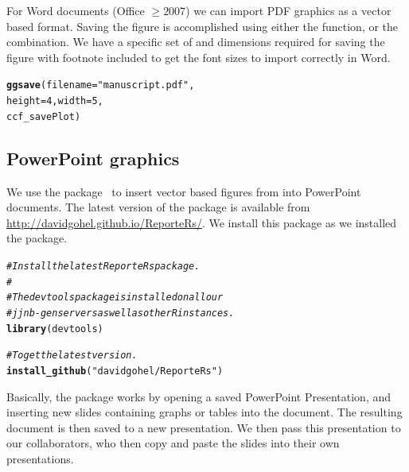 \documentclass[nojss]{jss}\usepackage[]{graphicx}\usepackage[]{color}
\makeatletter
\newcommand{\hlnum}[1]{\textcolor[rgb]{0.686,0.059,0.569}{#1}}%
\newcommand{\hlstr}[1]{\textcolor[rgb]{0.192,0.494,0.8}{#1}}%
\newcommand{\hlcom}[1]{\textcolor[rgb]{0.678,0.584,0.686}{\textit{#1}}}%
\newcommand{\hlstd}[1]{\textcolor[rgb]{0.345,0.345,0.345}{#1}}%
\newcommand{\hlkwc}[1]{\textcolor[rgb]{0.333,0.667,0.333}{#1}}%
\newcommand{\hlkwd}[1]{\textcolor[rgb]{0.737,0.353,0.396}{\textbf{#1}}}%
\newenvironment{kframe}{%
 \def\at@end@of@kframe{}%
 \ifinner\ifhmode%
  \def\at@end@of@kframe{\end{minipage}}%
  \begin{minipage}{\columnwidth}%
 \fi\fi%
 \def\FrameCommand##1{\hskip\@totalleftmargin \hskip-\fboxsep
 \colorbox{shadecolor}{##1}\hskip-\fboxsep
     \hskip-\linewidth \hskip-\@totalleftmargin \hskip\columnwidth}%
 \MakeFramed {\advance\hsize-\width
   \@totalleftmargin\z@ \linewidth\hsize
   \@setminipage}}%
 {\par\unskip\endMakeFramed%
 \at@end@of@kframe}
\newenvironment{knitrout}{}{} %
\makeatother
\begin{document}
For Word documents (Office $\ge 2007$) we can import PDF graphics as a vector based format. Saving the figure is accomplished using either the  function, or the  combination. We have a specific set of  and  dimensions required for saving the figure with footnote included to get the font sizes to import correctly in Word. 
\begin{knitrout}\footnotesize
{}\color{fgcolor}\begin{kframe}
\begin{alltt}
\hlkwd{ggsave}\hlstd{(}\hlkwc{filename}\hlstd{=}\hlstr{"manuscript.pdf"}\hlstd{,}
       \hlkwc{height}\hlstd{=}\hlnum{4}\hlstd{,} \hlkwc{width}\hlstd{=}\hlnum{5}\hlstd{,}
       \hlstd{ccf_savePlot)}
\end{alltt}
\end{kframe}
\end{knitrout}


\subsection{PowerPoint graphics}
We use the  package~\citep{Gohel:2014} to insert vector based figures from  into PowerPoint documents. The latest version of the  package is available from \url{http://davidgohel.github.io/ReporteRs/}. We install this package as we installed the  package.
\begin{knitrout}\footnotesize
{}\color{fgcolor}\begin{kframe}
\begin{alltt}
\hlcom{# Install the latest ReporteRs package.}
\hlcom{#}
\hlcom{# The devtools package is installed on all our }
\hlcom{# jjnb-gen servers as well as other R instances.}
\hlkwd{library}\hlstd{(devtools)}

\hlcom{# To get the latest version.}
\hlkwd{install_github}\hlstd{(}\hlstr{"davidgohel/ReporteRs"}\hlstd{)}
\end{alltt}
\end{kframe}
\end{knitrout}

Basically, the package works by opening a saved PowerPoint Presentation, and inserting new slides containing graphs or tables into the document. The resulting document is then saved to a new presentation. We then pass this presentation to our collaborators, who then copy and paste the  slides into their own presentations. 
\end{document}
